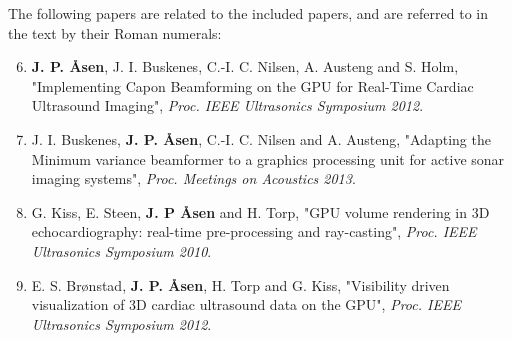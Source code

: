 \documentclass[10pt,b5paper,twoside]{book}
\begin{document}
The following papers are related to the included papers, and are referred to in the text by their Roman numerals: 

\begin{enumerate}[VI]
\setcounter{enumi}{5}
\renewcommand\labelenumi{\bfseries\theenumi}

	\item \textbf{J. P. \AA{}sen}, J. I. Buskenes, C.-I. C. Nilsen, A. Austeng and S. Holm, "Implementing Capon Beamforming on the GPU for Real-Time Cardiac Ultrasound Imaging", {\it Proc. IEEE Ultrasonics Symposium 2012}.

	\item J. I. Buskenes, \textbf{J. P. \AA{}sen}, C.-I. C. Nilsen and A. Austeng, "Adapting the Minimum variance beamformer to a graphics processing unit for active sonar imaging systems", {\it Proc. Meetings on Acoustics 2013}.
	
	\item G. Kiss, E. Steen, \textbf{J. P \AA{}sen} and H. Torp, "GPU volume rendering in 3D echocardiography: real-time pre-processing and ray-casting", {\it Proc. IEEE Ultrasonics Symposium 2010}.


	\item E. S. Br\o{}nstad, \textbf{J. P. \AA{}sen}, H. Torp and G. Kiss, "Visibility driven visualization of 3D cardiac ultrasound data on the GPU", {\it Proc. IEEE Ultrasonics Symposium 2012}.
\end{enumerate}

\newpage\thispagestyle{empty}
\pagestyle{fancy}
%
\tableofcontents

\begin{bibunit}[ieeetr]

\newpage{}
\putbib[bibIntroduction]
\end{bibunit}

\begin{bibunit}[ieeetr]

\newpage{}
\putbib[bibBackground]
\end{bibunit}
\end{document}

